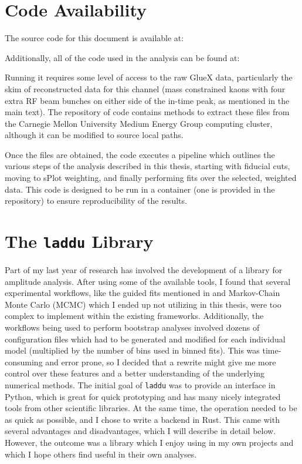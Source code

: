 \section{Code Availability}
The source code for this document is available at:

\begin{center}
\end{center}

Additionally, all of the code used in the analysis can be found at:

\begin{center}
\end{center}

Running it requires some level of access to the raw GlueX data, particularly the skim of reconstructed data for this channel (mass constrained kaons with four extra RF beam bunches on either side of the in-time peak, as mentioned in the main text). The repository of code contains methods to extract these files from the Carnegie Mellon University Medium Energy Group computing cluster, although it can be modified to source local paths.

Once the files are obtained, the code executes a pipeline which outlines the various steps of the analysis described in this thesis, starting with fiducial cuts, moving to sPlot weighting, and finally performing fits over the selected, weighted data. This code is designed to be run in a container (one is provided in the repository) to ensure reproducibility of the results.

\section{The \texttt{laddu} Library}
Part of my last year of research has involved the development of a library for amplitude analysis. After using some of the available tools, I found that several experimental workflows, like the guided fits mentioned in  and Markov-Chain Monte Carlo (MCMC) which I ended up not utilizing in this thesis, were too complex to implement within the existing frameworks. Additionally, the workflows being used to perform bootstrap analyses involved dozens of configuration files which had to be generated and modified for each individual model (multiplied by the number of bins used in binned fits). This was time-consuming and error prone, so I decided that a rewrite might give me more control over these features and a better understanding of the underlying numerical methods. The initial goal of \texttt{laddu} was to provide an interface in Python, which is great for quick prototyping and has many nicely integrated tools from other scientific libraries. At the same time, the operation needed to be as quick as possible, and I chose to write a backend in Rust. This came with several advantages and disadvantages, which I will describe in detail below. However, the outcome was a library which I enjoy using in my own projects and which I hope others find useful in their own analyses.

